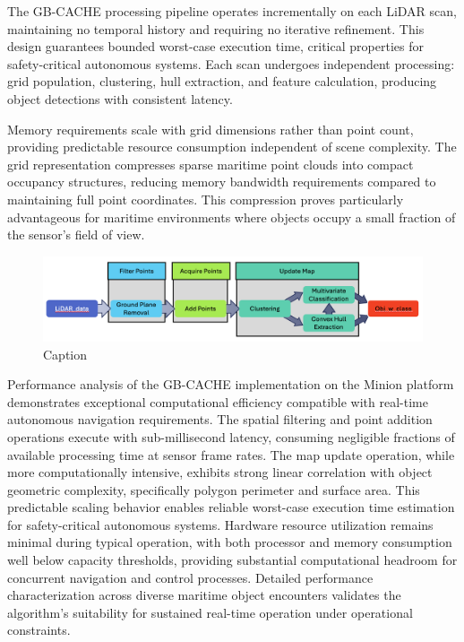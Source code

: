 \documentclass[../main.tex]{subfiles}
\begin{document}
The GB-CACHE processing pipeline operates incrementally on each \ac{LiDAR} scan, maintaining no temporal history and requiring no iterative refinement.
This design guarantees bounded worst-case execution time, critical properties for safety-critical autonomous systems.
Each scan undergoes independent processing: grid population, clustering, hull extraction, and feature calculation, producing object detections with consistent latency.

Memory requirements scale with grid dimensions rather than point count, providing predictable resource consumption independent of scene complexity.
The grid representation compresses sparse maritime point clouds into compact occupancy structures, reducing memory bandwidth requirements compared to maintaining full point coordinates.
This compression proves particularly advantageous for maritime environments where objects occupy a small fraction of the sensor's field of view.

\begin{figure}
    \centering
    \includegraphics[width=0.95\linewidth]{Images/gbcache_flow.png}
    \caption{Caption}
    \label{fig:gbcache_flow}
\end{figure}

Performance analysis of the \ac{GB-CACHE} implementation on the Minion platform demonstrates exceptional computational efficiency compatible with real-time autonomous navigation requirements.
The spatial filtering and point addition operations execute with sub-millisecond latency, consuming negligible fractions of available processing time at sensor frame rates.
The map update operation, while more computationally intensive, exhibits strong linear correlation with object geometric complexity, specifically polygon perimeter and surface area.
This predictable scaling behavior enables reliable worst-case execution time estimation for safety-critical autonomous systems.
Hardware resource utilization remains minimal during typical operation, with both processor and memory consumption well below capacity thresholds, providing substantial computational headroom for concurrent navigation and control processes.
Detailed performance characterization across diverse maritime object encounters validates the algorithm's suitability for sustained real-time operation under operational constraints.
\end{document}
